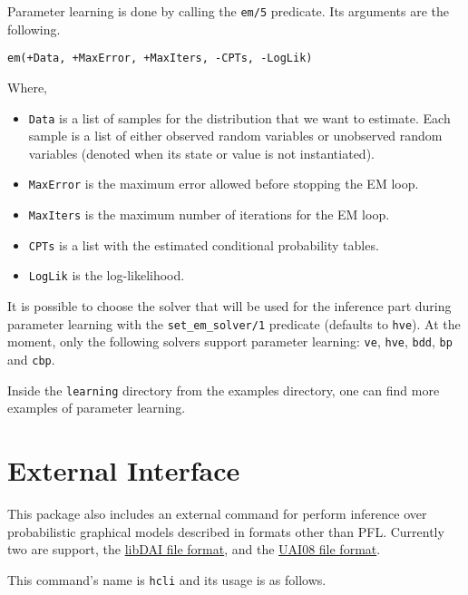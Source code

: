 \documentclass{article}
\begin{document}
Parameter learning is done by calling the \texttt{em/5} predicate. Its arguments are the following.

\texttt{em(+Data, +MaxError, +MaxIters, -CPTs, -LogLik)}

Where,
\begin{itemize}
 \item \texttt{Data} is a list of samples for the distribution that we want to estimate. Each sample is a list of either observed random variables or unobserved random variables (denoted when its state or value is not instantiated).
 \item \texttt{MaxError} is the maximum error allowed before stopping the EM loop.
 \item \texttt{MaxIters} is the maximum number of iterations for the EM loop.
 \item \texttt{CPTs} is a list with the estimated conditional probability tables.
 \item \texttt{LogLik} is the log-likelihood.
\end{itemize}


It is possible to choose the solver that will be used for the inference part during parameter learning with the \texttt{set\_em\_solver/1} predicate (defaults to \texttt{hve}). At the moment, only the following solvers support parameter learning: \texttt{ve}, \texttt{hve}, \texttt{bdd}, \texttt{bp} and \texttt{cbp}.

Inside the \texttt{learning} directory from the examples directory, one can find more examples of parameter learning.



\section{External Interface}
This package also includes an external command for perform inference over probabilistic graphical models described in formats other than PFL. Currently two are support, the \href{http://cs.ru.nl/~jorism/libDAI/doc/fileformats.html}{libDAI file format}, and the \href{http://graphmod.ics.uci.edu/uai08/FileFormat}{UAI08 file format}.

This command's name is \texttt{hcli} and its usage is as follows.
\end{document}

